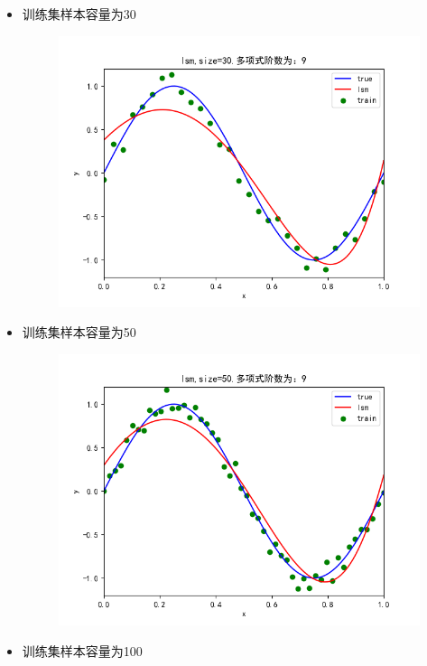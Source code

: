 \documentclass[lang=cn,a4paper,cite=authoryear]{elegantpaper}
\begin{document}
\begin{itemize}
	\item 训练集样本容量为30
	\begin{figure}[H]
		\centering
		\includegraphics[scale=0.5]{g30}
	\end{figure}
	\item 训练集样本容量为50
	\begin{figure}[H]
		\centering
		\includegraphics[scale=0.5]{g50}
	\end{figure}
	\item 训练集样本容量为100
	\begin{figure}[H]
		\centering

\end{figure}
\end{itemize}
\end{document}
